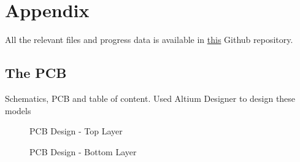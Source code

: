 

\chapter{Appendix}
All the relevant files and progress data is available in \href{https://github.com/dakshinatharindu/Hot-Plate.git}{this} Github repository.
\section{The PCB}
Schematics, PCB and table of content.
Used Altium Designer to design these models


  \begin{figure}
  \noindent{}
  \caption{PCB Design - Top Layer}
\end{figure}

  \begin{figure}
  \noindent{}
  \caption{PCB Design - Bottom Layer}
\end{figure}

